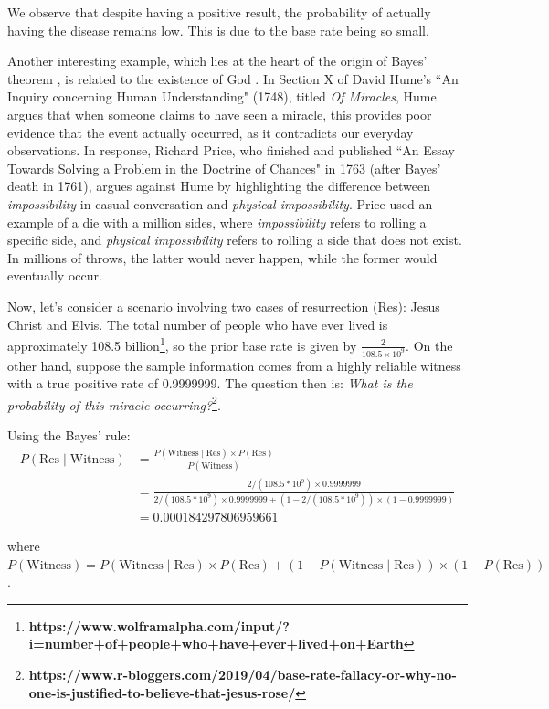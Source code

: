 We observe that despite having a positive result, the probability of actually having the disease remains low. This is due to the base rate being so small.

Another interesting example, which lies at the heart of the origin of Bayes' theorem \cite{bayes1763lii}, is related to the existence of God \cite{stigler2018richard}. In Section X of David Hume's ``An Inquiry concerning Human Understanding" (1748), titled \textit{Of Miracles}, Hume argues that when someone claims to have seen a miracle, this provides poor evidence that the event actually occurred, as it contradicts our everyday observations. In response, Richard Price, who finished and published ``An Essay Towards Solving a Problem in the Doctrine of Chances" in 1763 (after Bayes' death in 1761), argues against Hume by highlighting the difference between \textit{impossibility} in casual conversation and \textit{physical impossibility}. Price used an example of a die with a million sides, where \textit{impossibility} refers to rolling a specific side, and \textit{physical impossibility} refers to rolling a side that does not exist. In millions of throws, the latter would never happen, while the former would eventually occur.

Now, let's consider a scenario involving two cases of resurrection (Res): Jesus Christ and Elvis. The total number of people who have ever lived is approximately 108.5 billion\footnote{\textbf{https://www.wolframalpha.com/input/?i=number+of+people+who+have+ever+lived+on+Earth}}, so the prior base rate is given by \( \frac{2}{108.5 \times 10^9} \). On the other hand, suppose the sample information comes from a highly reliable witness with a true positive rate of 0.9999999. The question then is: \textit{What is the probability of this miracle occurring?}\footnote{\textbf{https://www.r-bloggers.com/2019/04/base-rate-fallacy-or-why-no-one-is-justified-to-believe-that-jesus-rose/}}.

Using the Bayes' rule:
{\small{
\begin{align*}
	P(\text{Res}\mid \text{Witness}) & =  \frac{P(\text{Witness}\mid \text{Res})\times P(\text{Res})}{P(\text{Witness})}\\
	& =\frac{2/(108.5 * 10^9) \times 0.9999999}{2/(108.5 * 10^9) \times 0.9999999 + (1-2/(108.5 * 10^9)) \times (1-0.9999999)}\\
	& = 0.000184297806959661
\end{align*}
}}

where $P(\text{Witness})=P(\text{Witness}\mid \text{Res})\times P(\text{Res})+(1-P(\text{Witness}\mid \text{Res}))\times (1-P(\text{Res}))$.

